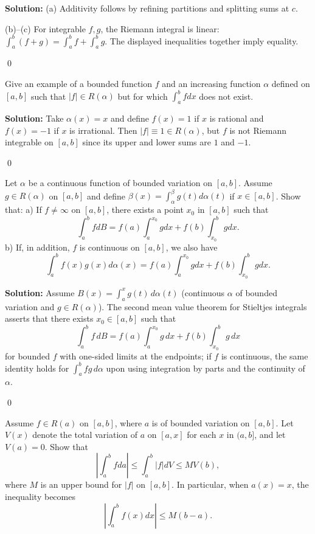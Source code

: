 \noindent\textbf{Solution:}
(a) Additivity follows by refining partitions and splitting sums at $c$.

(b)–(c) For integrable $f,g$, the Riemann integral is linear: $\int_a^b(f+g)=\int_a^b f+\int_a^b g$. The displayed inequalities together imply equality.




\qed
\begin{problembox}
Give an example of a bounded function $f$ and an increasing function $\alpha$ defined on $[a, b]$ such that $|f| \in R(\alpha)$ but for which $\int_{a}^{b} f dx$ does not exist.
\end{problembox}

\noindent\textbf{Solution:}
Take $\alpha(x)=x$ and define $f(x)=1$ if $x$ is rational and $f(x)=-1$ if $x$ is irrational. Then $|f|\equiv 1\in R(\alpha)$, but $f$ is not Riemann integrable on $[a,b]$ since its upper and lower sums are $1$ and $-1$.




\qed
\begin{problembox}
Let $\alpha$ be a continuous function of bounded variation on $[a, b]$. Assume $g \in R(\alpha)$ on $[a, b]$ and define $\beta(x) = \int_{\alpha}^{\beta} g(t) d\alpha(t)$ if $x \in [a, b]$. Show that:
a) If $f \neq \infty$ on $[a, b]$, there exists a point $x_0$ in $[a, b]$ such that
\[\int_{a}^{b} f dB = f(a) \int_{a}^{x_0} g dx + f(b) \int_{x_0}^{b} g dx.\]
b) If, in addition, $f$ is continuous on $[a, b]$, we also have
\[\int_{a}^{b} f(x)g(x) d\alpha(x) = f(a) \int_{a}^{x_0} g dx + f(b) \int_{x_0}^{b} g dx.\]
\end{problembox}

\noindent\textbf{Solution:}
Assume $B(x)=\int_a^x g(t)\,d\alpha(t)$ (continuous $\alpha$ of bounded variation and $g\in R(\alpha)$). The second mean value theorem for Stieltjes integrals asserts that there exists $x_0\in[a,b]$ such that
\[\int_a^b f\,dB = f(a)\int_a^{x_0} g\,dx + f(b)\int_{x_0}^b g\,dx\]
for bounded $f$ with one-sided limits at the endpoints; if $f$ is continuous, the same identity holds for $\int_a^b f g\,d\alpha$ upon using integration by parts and the continuity of $\alpha$.




\qed
\begin{problembox}
Assume $f \in R(a)$ on $[a, b]$, where $a$ is of bounded variation on $[a, b]$. Let $V(x)$ denote the total variation of $a$ on $[a, x]$ for each $x$ in $(a, b]$, and let $V(a) = 0$. Show that
\[\left| \int_a^b f da \right| \leq \int_a^b |f| dV \leq MV(b),\]
where $M$ is an upper bound for $|f|$ on $[a, b]$. In particular, when $a(x) = x$, the inequality becomes
\[\left| \int_a^b f(x) dx \right| \leq M(b - a).\]
\end{problembox}

